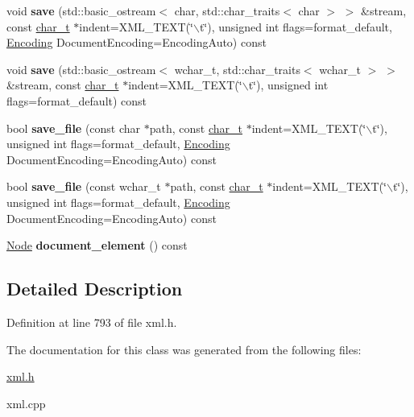 \begin{DoxyCompactItemize}
\item 
\hypertarget{classphys_1_1xml_1_1Document_a50672235c95905a03739eade3e4e6bab}{
void {\bfseries save} (std::basic\_\-ostream$<$ char, std::char\_\-traits$<$ char $>$ $>$ \&stream, const \hyperlink{namespacephys_1_1xml_afc87705cd1c2917d87b879715a2d8f6e}{char\_\-t} $\ast$indent=XML\_\-TEXT(\char`\"{}$\backslash$t\char`\"{}), unsigned int flags=format\_\-default, \hyperlink{namespacephys_1_1xml_a420f5de782438f88160321385bea2015}{Encoding} DocumentEncoding=EncodingAuto) const }
\label{dd/d44/classphys_1_1xml_1_1Document_a50672235c95905a03739eade3e4e6bab}

\item 
\hypertarget{classphys_1_1xml_1_1Document_a8bdba6317f7ba369c3c83f2e3f77829a}{
void {\bfseries save} (std::basic\_\-ostream$<$ wchar\_\-t, std::char\_\-traits$<$ wchar\_\-t $>$ $>$ \&stream, const \hyperlink{namespacephys_1_1xml_afc87705cd1c2917d87b879715a2d8f6e}{char\_\-t} $\ast$indent=XML\_\-TEXT(\char`\"{}$\backslash$t\char`\"{}), unsigned int flags=format\_\-default) const }
\label{dd/d44/classphys_1_1xml_1_1Document_a8bdba6317f7ba369c3c83f2e3f77829a}

\item 
\hypertarget{classphys_1_1xml_1_1Document_a1f9fd55482d97b3fab035437058a6626}{
bool {\bfseries save\_\-file} (const char $\ast$path, const \hyperlink{namespacephys_1_1xml_afc87705cd1c2917d87b879715a2d8f6e}{char\_\-t} $\ast$indent=XML\_\-TEXT(\char`\"{}$\backslash$t\char`\"{}), unsigned int flags=format\_\-default, \hyperlink{namespacephys_1_1xml_a420f5de782438f88160321385bea2015}{Encoding} DocumentEncoding=EncodingAuto) const }
\label{dd/d44/classphys_1_1xml_1_1Document_a1f9fd55482d97b3fab035437058a6626}

\item 
\hypertarget{classphys_1_1xml_1_1Document_ae8bafc167ac2ae03d0b4d3ad4502d2a7}{
bool {\bfseries save\_\-file} (const wchar\_\-t $\ast$path, const \hyperlink{namespacephys_1_1xml_afc87705cd1c2917d87b879715a2d8f6e}{char\_\-t} $\ast$indent=XML\_\-TEXT(\char`\"{}$\backslash$t\char`\"{}), unsigned int flags=format\_\-default, \hyperlink{namespacephys_1_1xml_a420f5de782438f88160321385bea2015}{Encoding} DocumentEncoding=EncodingAuto) const }
\label{dd/d44/classphys_1_1xml_1_1Document_ae8bafc167ac2ae03d0b4d3ad4502d2a7}

\item 
\hypertarget{classphys_1_1xml_1_1Document_a481cbf277cfe6d6daf1b66f8d862b88e}{
\hyperlink{classphys_1_1xml_1_1Node}{Node} {\bfseries document\_\-element} () const }
\label{dd/d44/classphys_1_1xml_1_1Document_a481cbf277cfe6d6daf1b66f8d862b88e}

\end{DoxyCompactItemize}


\subsection{Detailed Description}


Definition at line 793 of file xml.h.



The documentation for this class was generated from the following files:\begin{DoxyCompactItemize}
\item 
\hyperlink{xml_8h}{xml.h}\item 
xml.cpp\end{DoxyCompactItemize}

